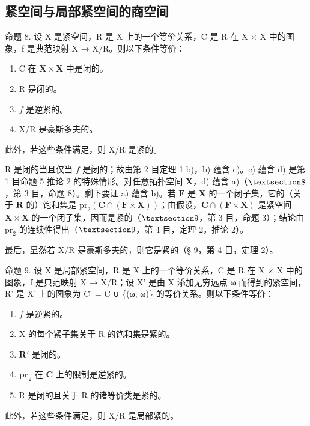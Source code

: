 \subsection{紧空间与局部紧空间的商空间}

命题 8. 设 X 是紧空间，R 是 X 上的一个等价关系，C 是 R 在 X × X 中的图象，f 是典范映射 X → X/R。则以下条件等价：

\begin{enumerate}
\def\labelenumi{\alph{enumi})}
\item
  C 在 \(\mathbf{X} \times \mathbf{X}\) 中是闭的。
\item
  R 是闭的。
\item
  \(f\) 是逆紧的。
\item
  X/R 是豪斯多夫的。
\end{enumerate}

此外，若这些条件满足，则 X/R 是紧的。

R 是闭的当且仅当 \(f\) 是闭的；故由第 2 目定理 1 b)，b) 蕴含 c)。c) 蕴含 d) 是第 1 目命题 5 推论 2 的特殊情形。对任意拓扑空间 \(\mathbf{X}\)，d) 蕴含 a)（\(\S 8\)，第 3 目，命题 8）。剩下要证 a) 蕴含 b)。若 \(\mathbf{F}\) 是 \(\mathbf{X}\) 的一个闭子集，它的（关于 \(\mathbf{R}\) 的）饱和集是 \(\mathrm{pr}_2(\mathbf{C} \cap (\mathbf{F} \times \mathbf{X}))\)；由假设，\(\mathbf{C} \cap (\mathbf{F} \times \mathbf{X})\) 是紧空间 \(\mathbf{X} \times \mathbf{X}\) 的一个闭子集，因而是紧的（\(\S 9\)，第 3 目，命题 3）；结论由 \(\mathrm{pr}_2\) 的连续性得出（\(\S 9\)，第 4 目，定理 2，推论 2）。

最后，显然若 X/R 是豪斯多夫的，则它是紧的（§ 9，第 4 目，定理 2）。

命题 9. 设 X 是局部紧空间，R 是 X 上的一个等价关系，C 是 R 在 X × X 中的图象，f 是典范映射 X → X/R；设 X' 是由 X 添加无穷远点 ω 而得到的紧空间，R' 是 X' 上的图象为 C' = C ∪ \{(ω, ω)\} 的等价关系。则以下条件等价：

\begin{enumerate}
\def\labelenumi{\alph{enumi})}
\item
  \(f\) 是逆紧的。
\item
  X 的每个紧子集关于 R 的饱和集是紧的。
\item
  \(\mathbf{R}'\) 是闭的。
\item
  \(\mathbf{pr}_2\) 在 \(\mathbf{C}\) 上的限制是逆紧的。
\item
  R 是闭的且关于 R 的诸等价类是紧的。
\end{enumerate}

此外，若这些条件满足，则 X/R 是局部紧的。

